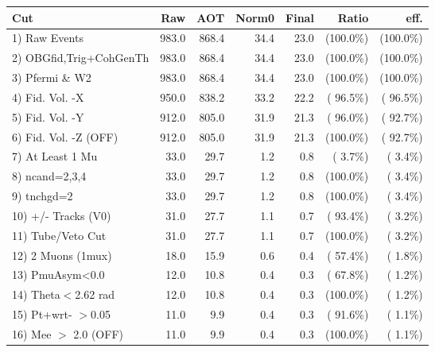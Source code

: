  \begin{table}[h!]\centering
 \begin{tabular}{||l||r|r|r|r|r|r||}
 \hline
 \hline
 Cut & Raw & AOT & Norm0 & Final & Ratio & eff.       \\
 \hline
  1) Raw Events           &        983.0 &        868.4 &         34.4 &         23.0 & (100.0\%) & (100.0\%) \\
  2) OBGfid,Trig+CohGenTh &        983.0 &        868.4 &         34.4 &         23.0 & (100.0\%) & (100.0\%) \\
  3) Pfermi \& W2         &        983.0 &        868.4 &         34.4 &         23.0 & (100.0\%) & (100.0\%) \\
  4) Fid. Vol. -X         &        950.0 &        838.2 &         33.2 &         22.2 & ( 96.5\%) & ( 96.5\%) \\
  5) Fid. Vol. -Y         &        912.0 &        805.0 &         31.9 &         21.3 & ( 96.0\%) & ( 92.7\%) \\
  6) Fid. Vol. -Z (OFF)   &        912.0 &        805.0 &         31.9 &         21.3 & (100.0\%) & ( 92.7\%) \\
  7) At Least 1 Mu        &         33.0 &         29.7 &          1.2 &          0.8 & (  3.7\%) & (  3.4\%) \\
  8) ncand=2,3,4          &         33.0 &         29.7 &          1.2 &          0.8 & (100.0\%) & (  3.4\%) \\
  9) tnchgd=2             &         33.0 &         29.7 &          1.2 &          0.8 & (100.0\%) & (  3.4\%) \\
 10) +/- Tracks (V0)      &         31.0 &         27.7 &          1.1 &          0.7 & ( 93.4\%) & (  3.2\%) \\
 11) Tube/Veto Cut        &         31.0 &         27.7 &          1.1 &          0.7 & (100.0\%) & (  3.2\%) \\
 12) 2 Muons (1mux)       &         18.0 &         15.9 &          0.6 &          0.4 & ( 57.4\%) & (  1.8\%) \\
 13) PmuAsym<0.0          &         12.0 &         10.8 &          0.4 &          0.3 & ( 67.8\%) & (  1.2\%) \\
 14) Theta$<$2.62 rad     &         12.0 &         10.8 &          0.4 &          0.3 & (100.0\%) & (  1.2\%) \\
 15) Pt+wrt- $>$0.05      &         11.0 &          9.9 &          0.4 &          0.3 & ( 91.6\%) & (  1.1\%) \\
 16) Mee $>$ 2.0  (OFF)   &         11.0 &          9.9 &          0.4 &          0.3 & (100.0\%) & (  1.1\%) \\

\end{tabular}
\end{table}

